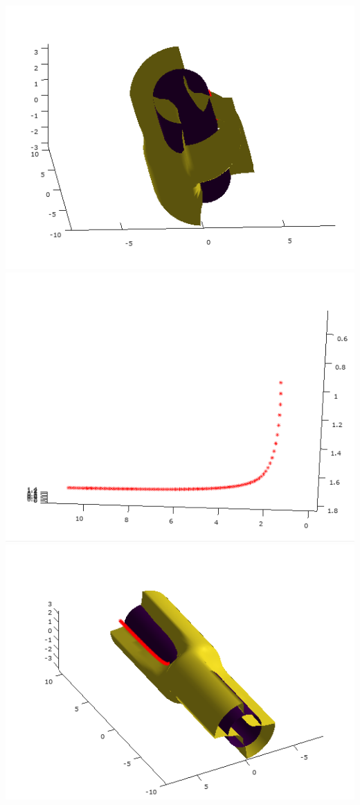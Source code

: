 \documentclass[]{article}
\begin{document}
	\includegraphics[scale=0.3]{primer5_2} \\
	\includegraphics[scale=0.3]{primer5_3}
	\includegraphics[scale=0.3]{primer5_4} \\ \\
\end{document}
